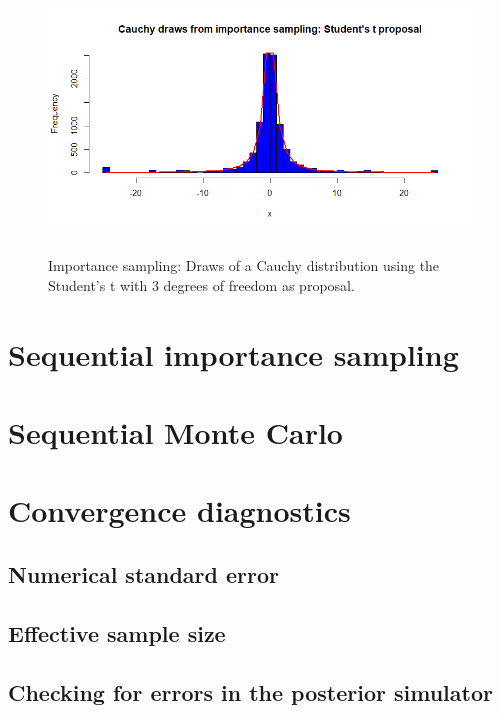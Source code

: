\begin{figure}[!h]
	\includegraphics[width=340pt, height=200pt]{Chapters/chapter5/figures/IScauchyStudent.png}
	\caption[List of figure caption goes here]{Importance sampling: Draws of a Cauchy distribution using the Student's t with 3 degrees of freedom as proposal.}\label{fig57}
\end{figure}       

\section{Sequential importance sampling}\label{sec53}


\section{Sequential Monte Carlo}\label{sec54}

\section{Convergence diagnostics}\label{sec55}

\subsection{Numerical standard error}
\subsection{Effective sample size}
\subsection{Checking for errors in the posterior simulator}

